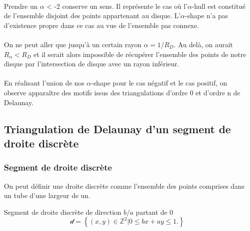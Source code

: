 \paragraph{}
Prendre un $\alpha$ < -2 conserve un sens. Il représente le cas où l'$\alpha$-hull est constitué de l'ensemble disjoint des points appartenant au disque. L'$\alpha$-shape n'a pas d'existence propre dans ce cas au vue de l'ensemble pas connexe.

\paragraph{}
On ne peut aller que jusqu'à un certain rayon $\alpha = 1/R_D$. Au delà, on aurait $R_{\alpha} < R_D$ et il serait alors impossible de récupérer l'ensemble des points de notre disque par l'intersection de disque avec un rayon inférieur.

\paragraph{}
En réalisant l'union de nos $\alpha$-shape pour le cas négatif et le cas positif, on observe apparaître des motifs issus des triangulations d'ordre 0 et d'ordre n de Delaunay. 

\subsection{Triangulation de Delaunay d'un segment de droite discrète}

\subsubsection{Segment de droite discrète}

On peut définir une droite discrète comme l'ensemble des points comprises dans un tube d'une largeur de un.

\begin{Definition}{Segment de droite discrète de direction $b / a$ partant de $0$}
\label{def:sdd}
    $$\mathcal{d} =  \left\{ (x,y) \in \mathbb{Z}^{2} |  0 \leq b x + a y \leq 1. \right\}$$
\end{Definition}


